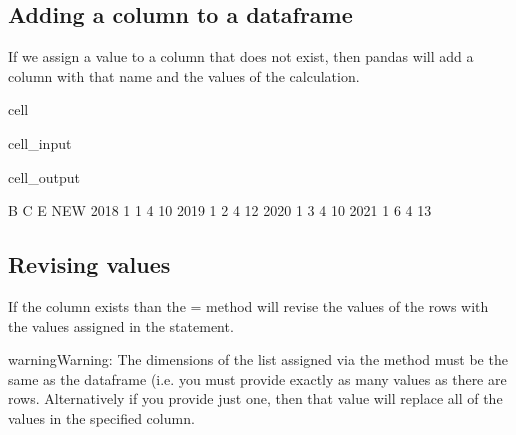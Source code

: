 \documentclass[letterpaper,10pt,english]{jupyterBook}
\begin{document}
\subsection{Adding a column to a dataframe}
\label{\detokenize{content/04_PythonEssentials/PythonPackagesEtc:adding-a-column-to-a-dataframe}}
\sphinxAtStartPar
If we assign a value to a column that does not exist, then pandas will add a column with that name and the values of the calculation.

\begin{sphinxuseclass}{cell}\begin{sphinxVerbatimInput}

\begin{sphinxuseclass}{cell_input}
\begin{sphinxVerbatim}[commandchars=\\\{\}]
\PYG{p}{[}\PYG{p}{]}\PYG{p}{[}\PYG{p}{]}
\end{sphinxVerbatim}

\end{sphinxuseclass}\end{sphinxVerbatimInput}
\begin{sphinxVerbatimOutput}

\begin{sphinxuseclass}{cell_output}
\begin{sphinxVerbatim}[commandchars=\\\{\}]
      B  C  E  NEW
2018  1  1  4   10
2019  1  2  4   12
2020  1  3  4   10
2021  1  6  4   13
\end{sphinxVerbatim}

\end{sphinxuseclass}\end{sphinxVerbatimOutput}

\end{sphinxuseclass}

\subsection{Revising values}
\label{\detokenize{content/04_PythonEssentials/PythonPackagesEtc:revising-values}}
\sphinxAtStartPar
If the column exists than the = method will revise the values of the rows with the values assigned in the statement.

\begin{sphinxadmonition}{warning}{Warning:}
\sphinxAtStartPar
The dimensions of the list assigned via the \sphinxcode{\sphinxupquote{=}} method must be the same as the dataframe (i.e. you must provide exactly as many values as there are rows.  Alternatively if you provide just one, then that value will replace all of the values in the specified column.
\end{sphinxadmonition}
\end{document}
